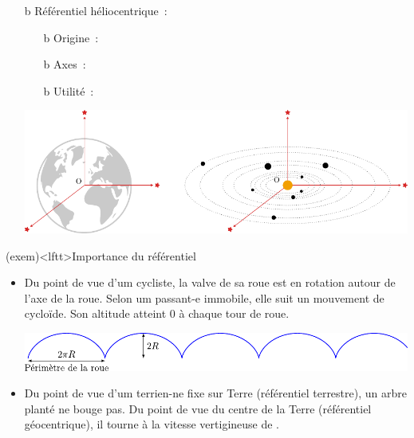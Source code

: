 \documentclass[../../main/main.tex]{subfiles}
\begin{document}
\begin{tcb*}[breakable]
\begin{itemize}
\begin{itemize}
{				            fixes}
			      \item[b]{Utilité}~: 
		      \end{itemize}
		      \begin{center}
		      \end{center}
		\item[b]{Référentiel héliocentrique}~:
		      \begin{itemize}
			      \item[b]{Origine}~: 
			      \item[b]{Axes}~: 
			      \item[b]{Utilité}~: 
		      \end{itemize}
		      \begin{center}
			      \includegraphics[width=.7\linewidth]{ref_geo-helio}
		      \end{center}
	\end{itemize}
\end{tcb*}

\begin{tcb}[breakable](exem)<lftt>{Importance du référentiel}
	\begin{itemize}
		\item Du point de vue d'um cycliste, la valve de sa roue est en rotation
		      autour de l'axe de la roue. Selon um passant-e immobile, elle suit un
		      mouvement de cycloïde. Son altitude atteint $0$ à chaque tour de roue.
		      \begin{center}
			      \includegraphics[width=\linewidth]{roue}
		      \end{center}
		\item Du point de vue d'um terrien-ne fixe sur Terre (référentiel
		      terrestre), un arbre planté ne bouge pas. Du point de vue du centre de la
		      Terre (référentiel géocentrique), il tourne à la vitesse vertigineuse de
		      .
	\end{itemize}
\end{tcb}
\end{document}
